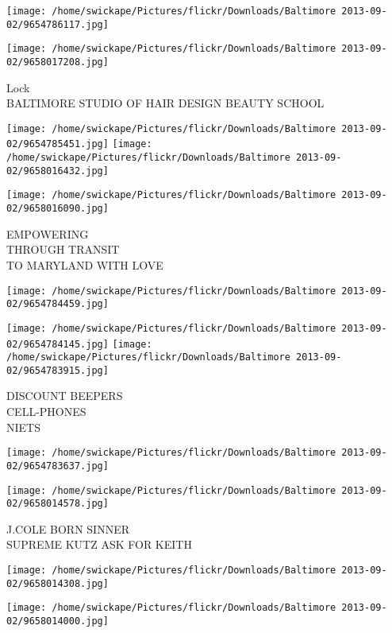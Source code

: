 \documentclass[10pt,letterpaper]{article}
\begin{document}
\texttt{[image: /home/swickape/Pictures/flickr/Downloads/Baltimore 2013-09-02/9654786117.jpg]}

\vspace{0.25in}
\texttt{[image: /home/swickape/Pictures/flickr/Downloads/Baltimore 2013-09-02/9658017208.jpg]}

Lock\\
BALTIMORE STUDIO OF HAIR DESIGN BEAUTY SCHOOL
\pagebreak

\texttt{[image: /home/swickape/Pictures/flickr/Downloads/Baltimore 2013-09-02/9654785451.jpg]}
\texttt{[image: /home/swickape/Pictures/flickr/Downloads/Baltimore 2013-09-02/9658016432.jpg]}

\texttt{[image: /home/swickape/Pictures/flickr/Downloads/Baltimore 2013-09-02/9658016090.jpg]}

EMPOWERING\\
THROUGH TRANSIT\\
TO MARYLAND WITH LOVE
\pagebreak

\texttt{[image: /home/swickape/Pictures/flickr/Downloads/Baltimore 2013-09-02/9654784459.jpg]}

\vspace{0.25in}
\texttt{[image: /home/swickape/Pictures/flickr/Downloads/Baltimore 2013-09-02/9654784145.jpg]}
\texttt{[image: /home/swickape/Pictures/flickr/Downloads/Baltimore 2013-09-02/9654783915.jpg]}

DISCOUNT BEEPERS\\
CELL{-}PHONES\\
NIETS
\pagebreak

\texttt{[image: /home/swickape/Pictures/flickr/Downloads/Baltimore 2013-09-02/9654783637.jpg]}

\vspace{0.25in}
\texttt{[image: /home/swickape/Pictures/flickr/Downloads/Baltimore 2013-09-02/9658014578.jpg]}

J.COLE BORN SINNER\\
SUPREME KUTZ ASK FOR KEITH
\pagebreak

\texttt{[image: /home/swickape/Pictures/flickr/Downloads/Baltimore 2013-09-02/9658014308.jpg]}

\vspace{0.25in}
\texttt{[image: /home/swickape/Pictures/flickr/Downloads/Baltimore 2013-09-02/9658014000.jpg]}
\end{document}
